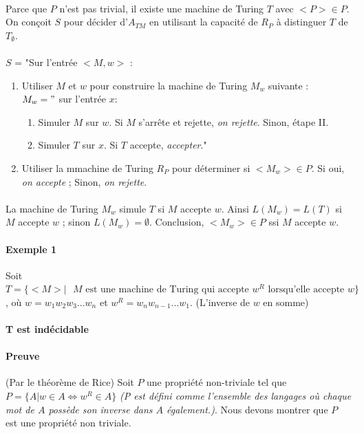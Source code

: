 \paragraph{}
Parce que $P$ n'est pas trivial, il existe une machine de Turing $T$ avec $<P> \in P$. On conçoit $S$ pour décider d'$A_{TM}$ en utilisant la capacité de $R_{P}$ à distinguer $T$ de $T_{\emptyset}$.

\paragraph{}
$S$ = "Sur l'entrée $<M, w>$ :
\begin{enumerate}
\item Utiliser $M$ et $w$ pour construire la machine de Turing $M_{w}$ suivante : \\
$M_{w} = "$ sur l'entrée $x$:
	\begin{enumerate}[I]
	\item Simuler $M$ sur $w$. Si $M$ s'arrête et rejette, \textit{on rejette}. Sinon, étape II.
    \item Simuler $T$ sur $x$. Si $T$ accepte, \textit{accepter}."
	\end{enumerate}
\item Utiliser la mmachine de Turing $R_{P}$ pour déterminer si $<M_{w}> \in P$. Si oui, \textit{on accepte} ; Sinon,  \textit{on rejette}.
\end{enumerate}
\paragraph{}
La machine de Turing $M_{w}$ simule $T$ si $M$ accepte $w$. Ainsi $L(M_{w}) = L(T)$ si $M$ accepte $w$ ; sinon  $L(M_{w}) = \emptyset$. Conclusion, $<M_{w}> \in P$ ssi $M$ accepte $w$.


\paragraph{Exemple 1}
Soit $T = \{<M> | \text{ $M$ est une machine de Turing qui accepte } w^{R} \text{ lorsqu'elle accepte } w\}$, 
où $w = w_{1}w_{2}w_{3}...w_{n}$ et $w^{R} = w_{n}w_{n-1}...w_{1}$. (L'inverse de $w$ en somme)
\paragraph{T est indécidable}
\paragraph{Preuve} (Par le théorème de Rice) Soit $P$ une propriété non-triviale tel que $P = \{A | w \in A \Leftrightarrow w^{R} \in A \}$ \textit{(P est défini comme l'ensemble des langages où chaque mot de $A$ possède son inverse dans $A$ également.)}. Nous devons montrer que $P$ est une propriété non triviale.

